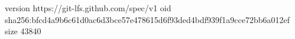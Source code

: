 version https://git-lfs.github.com/spec/v1
oid sha256:bfcd4a9b6c61d0ac6d3bce57e478615d6f93ded4bdf939f1a9cce72bb6a012ef
size 43840
